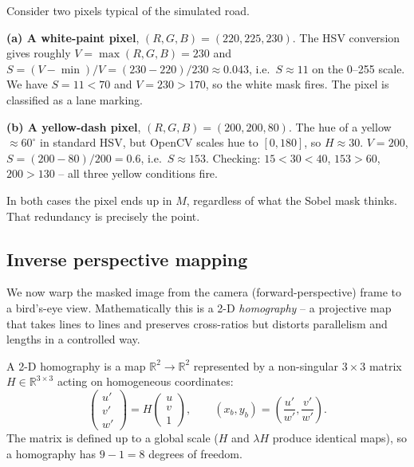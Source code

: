\begin{example}
Consider two pixels typical of the simulated road.

\noindent\textbf{(a) A white-paint pixel}, $(R,G,B)=(220,225,230)$.
The HSV conversion gives roughly $V=\max(R,G,B)=230$ and
$S=(V-\min)/V=(230-220)/230\approx 0.043$, i.e.\ $S\approx 11$ on the
0--255 scale. We have $S=11<70$ and $V=230>170$, so the white mask
fires. The pixel is classified as a lane marking.

\noindent\textbf{(b) A yellow-dash pixel}, $(R,G,B)=(200,200,80)$.
The hue of a yellow $\approx 60^\circ$ in standard HSV, but OpenCV
scales hue to $[0,180]$, so $H\approx 30$. $V=200$,
$S=(200-80)/200=0.6$, i.e.\ $S\approx 153$. Checking: $15<30<40$,
$153>60$, $200>130$ -- all three yellow conditions fire.

In both cases the pixel ends up in $M$, regardless of what the Sobel
mask thinks. That redundancy is precisely the point.
\end{example}

\subsection{Inverse perspective mapping}

We now warp the masked image from the camera (forward-perspective)
frame to a bird's-eye view. Mathematically this is a 2-D
\emph{homography} -- a projective map that takes lines to lines and
preserves cross-ratios but distorts parallelism and lengths in a
controlled way.

\begin{definition}[Homography]
A 2-D homography is a map $\mathbb{R}^2\to\mathbb{R}^2$ represented by
a non-singular $3\times 3$ matrix $H\in\mathbb{R}^{3\times 3}$ acting
on homogeneous coordinates:
\[
\begin{pmatrix}u'\\v'\\w'\end{pmatrix}
=H\begin{pmatrix}u\\v\\1\end{pmatrix},\qquad
(x_b,y_b)=\left(\frac{u'}{w'},\frac{v'}{w'}\right).
\]
The matrix is defined up to a global scale ($H$ and $\lambda H$
produce identical maps), so a homography has $9-1=8$ degrees of
freedom.
\end{definition}

